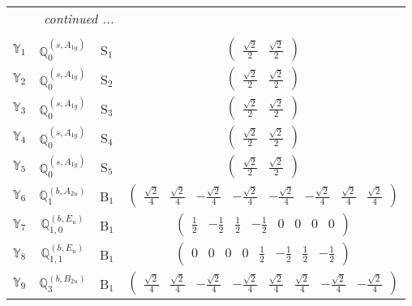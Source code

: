\documentclass[fleqn,10pt,landscape]{article}
\begin{document}
\begin{itemize}
\begin{center}
\begin{longtable}{c|c|c|c}
 \hline \hline
\multicolumn{3}{r}{\footnotesize\it continued ...} \\ \endfoot

 \hline \hline
\multicolumn{3}{r}{} \\ \endlastfoot

$ \mathbb{Y}_{1} $ & $\mathbb{Q}_{0}^{(s,A_{1g})}$ & S$_{1}$ & $\begin{pmatrix} \frac{\sqrt{2}}{2} & \frac{\sqrt{2}}{2} \end{pmatrix}$ \\ \hline
$ \mathbb{Y}_{2} $ & $\mathbb{Q}_{0}^{(s,A_{1g})}$ & S$_{2}$ & $\begin{pmatrix} \frac{\sqrt{2}}{2} & \frac{\sqrt{2}}{2} \end{pmatrix}$ \\ \hline
$ \mathbb{Y}_{3} $ & $\mathbb{Q}_{0}^{(s,A_{1g})}$ & S$_{3}$ & $\begin{pmatrix} \frac{\sqrt{2}}{2} & \frac{\sqrt{2}}{2} \end{pmatrix}$ \\ \hline
$ \mathbb{Y}_{4} $ & $\mathbb{Q}_{0}^{(s,A_{1g})}$ & S$_{4}$ & $\begin{pmatrix} \frac{\sqrt{2}}{2} & \frac{\sqrt{2}}{2} \end{pmatrix}$ \\ \hline
$ \mathbb{Y}_{5} $ & $\mathbb{Q}_{0}^{(s,A_{1g})}$ & S$_{5}$ & $\begin{pmatrix} \frac{\sqrt{2}}{2} & \frac{\sqrt{2}}{2} \end{pmatrix}$ \\ \hline
$ \mathbb{Y}_{6} $ & $\mathbb{Q}_{1}^{(b,A_{2u})}$ & B$_{1}$ & $\begin{pmatrix} \frac{\sqrt{2}}{4} & \frac{\sqrt{2}}{4} & - \frac{\sqrt{2}}{4} & - \frac{\sqrt{2}}{4} & - \frac{\sqrt{2}}{4} & - \frac{\sqrt{2}}{4} & \frac{\sqrt{2}}{4} & \frac{\sqrt{2}}{4} \end{pmatrix}$ \\
$ \mathbb{Y}_{7} $ & $\mathbb{Q}_{1,0}^{(b,E_{u})}$ & B$_{1}$ & $\begin{pmatrix} \frac{1}{2} & - \frac{1}{2} & \frac{1}{2} & - \frac{1}{2} & 0 & 0 & 0 & 0 \end{pmatrix}$ \\
$ \mathbb{Y}_{8} $ & $\mathbb{Q}_{1,1}^{(b,E_{u})}$ & B$_{1}$ & $\begin{pmatrix} 0 & 0 & 0 & 0 & \frac{1}{2} & - \frac{1}{2} & \frac{1}{2} & - \frac{1}{2} \end{pmatrix}$ \\
$ \mathbb{Y}_{9} $ & $\mathbb{Q}_{3}^{(b,B_{2u})}$ & B$_{1}$ & $\begin{pmatrix} \frac{\sqrt{2}}{4} & \frac{\sqrt{2}}{4} & - \frac{\sqrt{2}}{4} & - \frac{\sqrt{2}}{4} & \frac{\sqrt{2}}{4} & \frac{\sqrt{2}}{4} & - \frac{\sqrt{2}}{4} & - \frac{\sqrt{2}}{4} \end{pmatrix}$ \\ \hline

\end{longtable}
\end{center}
\end{itemize}
\end{document}
